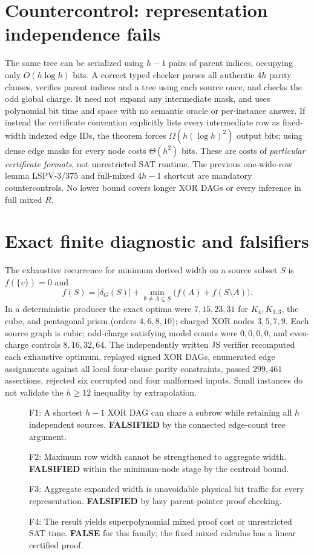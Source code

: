 \documentclass[11pt]{article}
\begin{document}
\section*{Countercontrol: representation independence fails}
The same tree can be serialized using \(h-1\) pairs of parent indices, occupying only \(O(h\log h)\) bits. A correct typed checker parses all authentic \(4h\) parity clauses, verifies parent indices and a tree using each source once, and checks the odd global charge. It need not expand any intermediate mask, and uses polynomial bit time and space with no semantic oracle or per-instance answer. If instead the certificate convention explicitly lists every intermediate row as fixed-width indexed edge IDs, the theorem forces \(\Omega(h(\log h)^2)\) output bits; using dense edge masks for every node costs \(\Theta(h^2)\) bits. These are costs of \emph{particular certificate formats}, not unrestricted SAT runtime. The previous one-wide-row lemma LSPV-3/375 and full-mixed \(4h-1\) shortcut are mandatory countercontrols. No lower bound covers longer XOR DAGs or every inference in full mixed \(R\).
\section*{Exact finite diagnostic and falsifiers}
The exhaustive recurrence for minimum derived width on a source subset \(S\) is \(f(\{v\})=0\) and
\[
f(S)=|\delta_G(S)|+\min_{\emptyset\ne A\subsetneq S}\bigl(f(A)+f(S\setminus A)\bigr).
\]
In a deterministic producer the exact optima were \(7,15,23,31\) for \(K_4,K_{3,3}\), the cube, and pentagonal prism (orders \(4,6,8,10\)); charged XOR nodes \(3,5,7,9\). Each source graph is cubic; odd-charge satisfying model counts were \(0,0,0,0\), and even-charge controls \(8,16,32,64\). The independently written JS verifier recomputed each exhaustive optimum, replayed signed XOR DAGs, enumerated edge assignments against all local four-clause parity constraints, passed \(299{,}461\) assertions, rejected six corrupted and four malformed inputs. Small instances do not validate the \(h\ge12\) inequality by extrapolation.
\begin{description}
\item[] F1: A shortest \(h-1\) XOR DAG can share a subrow while retaining all \(h\) independent sources. \textbf{FALSIFIED} by the connected edge-count tree argument.
\item[] F2: Maximum row width cannot be strengthened to aggregate width. \textbf{FALSIFIED} within the minimum-node stage by the centroid bound.
\item[] F3: Aggregate expanded width is unavoidable physical bit traffic for every representation. \textbf{FALSIFIED} by lazy parent-pointer proof checking.
\item[] F4: The result yields superpolynomial mixed proof cost or unrestricted SAT time. \textbf{FALSE} for this family; the fixed mixed calculus has a linear certified proof.
\end{description}
\end{document}
